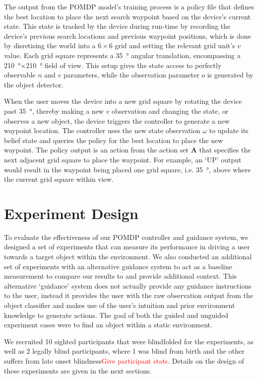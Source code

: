 \documentclass[runningheads]{llncs}
\newcommand\todo[1]{\textcolor{red}{#1}}
\begin{document}
The output from the POMDP model's training process is a policy file that defines the best location to place the next search waypoint based on the device's current state.
This state is tracked by the device during run-time by recording the device's previous search locations and previous waypoint positions, which is done by disretising the world into a $6\times6$ grid and setting the relevant grid unit's $v$ value.
Each grid square represents a \SI{35}{\degree} angular translation, encompassing a \SI{210}{\degree}$\times$\SI{210}{\degree} field of view. 
This setup gives the state access to perfectly observable $n$ and $v$ parameters, while the observation parameter $o$ is generated by the object detector. 

When the user moves the device into a new grid square by rotating the device past \SI{35}{\degree}, thereby making a new $v$ observation and changing the state, or observes a new object, the device triggers the controller to generate a new waypoint location.
The controller uses the new state observation $\omega$ to update its belief state and queries the policy for the best location to place the new waypoint. 
The policy output is an action from the action set $\mathbf{A}$ that specifies the next adjacent grid square to place the waypoint.
For example, an `UP' output would result in the waypoint being placed one grid square, i.e. \SI{35}{\degree}, above where the current grid square within view. 

\section{Experiment Design}\label{sec:experiments}

To evaluate the effectiveness of our POMDP controller and guidance system, we designed a set of experiments that can measure its performance in driving a user towards a target object within the environment. 
We also conducted an additional set of experiments with an alternative guidance system to act as a baseline measurement to compare our results to and provide additional context. 
This alternative `guidance' system does not actually provide any guidance instructions to the user, instead it provides the user with the raw observation output from the object classifier and makes use of the user's intuition and prior environment knowledge to generate actions. 
The goal of both the guided and unguided experiment cases were to find an object within a static environment. 

We recruited 10 sighted participants that were blindfolded for the experiments, as well as 2 legally blind participants, where 1 was blind from birth and the other suffers from late onset blindness\todo{Give participant stats}.
Details on the design of these experiments are given in the next sections. 
\end{document}
